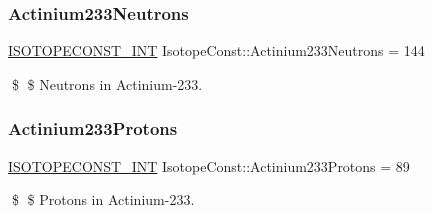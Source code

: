 \subsubsection{\texorpdfstring{Actinium233\+Neutrons}{Actinium233Neutrons}}
{\footnotesize\ttfamily \mbox{\hyperlink{group___isotope_const-_macros_ga5f18360b3e99483a35c32d789e62621c}{I\+S\+O\+T\+O\+P\+E\+C\+O\+N\+S\+T\+\_\+\+I\+NT}} Isotope\+Const\+::\+Actinium233\+Neutrons = 144}

\$ \$ Neutrons in Actinium-\/233. \mbox{\label{group___isotope_const-_actinium-_ac233_ga89c2ad6441d70babb87d3ab9555541d2}} 
\subsubsection{\texorpdfstring{Actinium233\+Protons}{Actinium233Protons}}
{\footnotesize\ttfamily \mbox{\hyperlink{group___isotope_const-_macros_ga5f18360b3e99483a35c32d789e62621c}{I\+S\+O\+T\+O\+P\+E\+C\+O\+N\+S\+T\+\_\+\+I\+NT}} Isotope\+Const\+::\+Actinium233\+Protons = 89}

\$ \$ Protons in Actinium-\/233. 